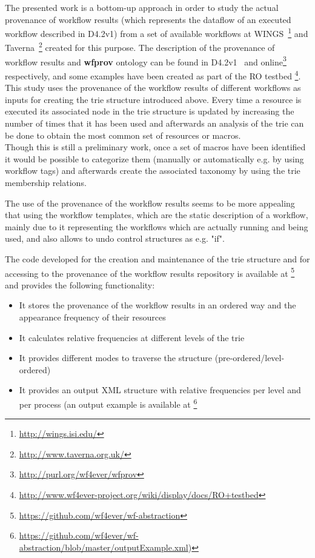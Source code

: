 The presented work is a bottom-up approach in order to study the actual provenance of workflow results (which represents the dataflow of an executed workflow described in D4.2v1) from a set of available workflows at WINGS~\footnote{\url{http://wings.isi.edu/}} and Taverna~\footnote{\url{http://www.taverna.org.uk/}} created for this purpose. The description of the provenance of workflow results and \textbf{wfprov} ontology can be found in D4.2v1~\cite{D4.2v1} and online\footnote{\url{http://purl.org/wf4ever/wfprov}} respectively, and some  examples have been created as part of the RO testbed \footnote{\url{http://www.wf4ever-project.org/wiki/display/docs/RO+testbed}}. \\

This study uses the provenance of the workflow results of different workflows as inputs for creating the trie structure introduced above. Every time a resource is executed its associated node in the trie structure is updated by increasing the number of times that it has been used and afterwards an analysis of the trie can be done to obtain the most common set of resources or macros. \\
 
Though this is still a preliminary work, once a set of macros have been identified it would be possible to categorize them (manually or automatically e.g. by using workflow tags) and afterwards create the associated taxonomy by using the trie membership relations.

The use of the provenance of the workflow results seems to be more appealing that using the workflow templates, which are the static description of a workflow, mainly due to it representing the workflows which are actually running and being used, and also allows to undo control structures as e.g. "if".

The code developed for the creation and maintenance of the trie structure and for accessing to the provenance of the workflow results repository is available at \footnote{\url{https://github.com/wf4ever/wf-abstraction}} and provides the following functionality:

\begin{itemize}
\item It stores the provenance of the workflow results in an ordered way and the appearance frequency of their resources
\item It calculates relative frequencies at different levels of the trie
\item It provides different modes to traverse the structure (pre-ordered/level-ordered)
\item It provides an output XML structure with relative frequencies per level and per process (an output example is available at \footnote{\url{https://github.com/wf4ever/wf-abstraction/blob/master/outputExample.xml})}
\end{itemize}


